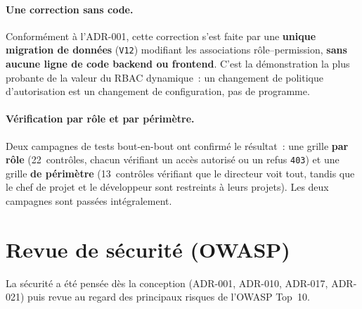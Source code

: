 \paragraph{Une correction sans code.} Conformément à l'ADR-001, cette correction s'est faite par une
\textbf{unique migration de données} (\texttt{V12}) modifiant les associations rôle--permission,
\textbf{sans aucune ligne de code backend ou frontend}. C'est la démonstration la plus probante de la
valeur du RBAC dynamique~: un changement de politique d'autorisation est un changement de
configuration, pas de programme.

\paragraph{Vérification par rôle et par périmètre.} Deux campagnes de tests bout-en-bout ont confirmé
le résultat~: une grille \textbf{par rôle} (22~contrôles, chacun vérifiant un accès autorisé ou un
refus \texttt{403}) et une grille \textbf{de périmètre} (13~contrôles vérifiant que le directeur voit
tout, tandis que le chef de projet et le développeur sont restreints à leurs projets). Les deux
campagnes sont passées intégralement.

\section{Revue de sécurité (OWASP)}

La sécurité a été pensée dès la conception (ADR-001, ADR-010, ADR-017, ADR-021) puis revue au regard
des principaux risques de l'OWASP Top~10.

